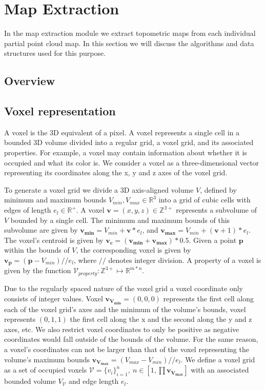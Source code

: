 \section{Map Extraction}
In the map extraction module we extract topometric maps from each individual partial point cloud map. In this section we will discuss the algorithms and data structures used for this purpose.

\subsection{Overview}

\subsection{Voxel representation}
A voxel is the 3D equivalent of a pixel. A voxel represents a single cell in a bounded 3D volume divided into a regular grid, a voxel grid, and its associated properties. For example, a voxel may contain information about whether it is occupied and what its color is. We consider a voxel as a three-dimensional vector representing its coordinates along the x, y and z axes of the voxel grid. 

To generate a voxel grid we divide a 3D axis-aligned volume \(V\), defined by minimum and maximum bounds \(V_{min}, V_{max} \in \mathbb{R}^{3}\) into a grid of cubic cells with edges of length \(e_{l} \in \mathbb{R}^+\). A voxel $\boldsymbol{v} = (x, y, z) \in \mathbb{Z^{3+}}$ represents a subvolume of \(V\) bounded by a single cell. The minimum and maximum bounds of this subvolume are given by \(\boldsymbol{v_{min}} = V_{min} + \boldsymbol{v}*e_{l}\), and \(\boldsymbol{v_{max}} = V_{min} + (\boldsymbol{v}+1)*e_{l}\). The voxel's centroid is given by \(\boldsymbol{v_c} = (\boldsymbol{v_{min}} + \boldsymbol{v_{max}})*0.5\). Given a point \(\boldsymbol{p}\) within the bounds of \(V\), the corresponding voxel is given by \(\boldsymbol{v_p} = (\boldsymbol{p} - V_{min})//e_l\), where \(//\) denotes integer division. A property of a voxel is given by the function \(\mathcal{V}_{property}: \mathbb{Z}^{3+} \mapsto \mathbb{R}^{m*n}\).

Due to the regularly spaced nature of the voxel grid a voxel coordinate only consists of integer values. Voxel \(\boldsymbol{v_{V_{min}}} = (0,0,0)\) represents the first cell along each of the voxel grid's axes and the minimum of the volume's bounds, voxel represents \((0,1,1)\) the first cell along the x and the second along the y and z axes, etc. We also restrict voxel coordinates to only be positive as negative coordinates would fall outside of the bounds of the volume. For the same reason, a voxel's coordinates can not be larger than that of the voxel representing the volume's maximum bounds \(\boldsymbol{v_{V_{max}}} = (V_{max} - V_{min})//e_l\). We define a voxel grid as a set of occupied voxels \(\mathcal{V}=\{v_{i}\}_{i=1}^{n},\ n \in [1, \prod{\boldsymbol{v_{V_{max}}}}]\) with an associated bounded volume \(V_{\mathcal{V}}\) and edge length \(e_{l}\).

